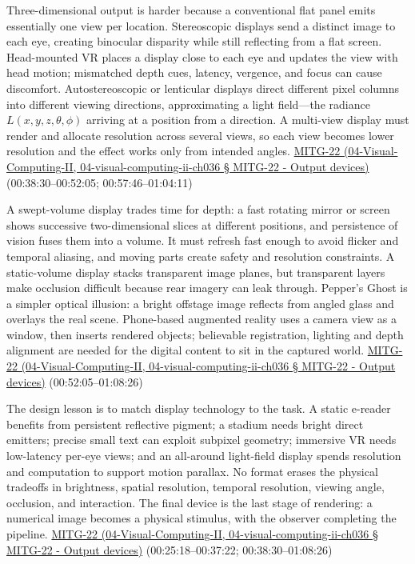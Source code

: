 Three-dimensional output is harder because a conventional flat panel emits essentially one view per location. Stereoscopic displays send a distinct image to each eye, creating binocular disparity while still reflecting from a flat screen. Head-mounted VR places a display close to each eye and updates the view with head motion; mismatched depth cues, latency, vergence, and focus can cause discomfort. Autostereoscopic or lenticular displays direct different pixel columns into different viewing directions, approximating a light field---the radiance \(L(x,y,z,\theta,\phi)\) arriving at a position from a direction. A multi-view display must render and allocate resolution across several views, so each view becomes lower resolution and the effect works only from intended angles. \href{}{MITG-22 (04-Visual-Computing-II, 04-visual-computing-ii-ch036 § MITG-22 - Output devices)} (00:38:30--00:52:05; 00:57:46--01:04:11)

A swept-volume display trades time for depth: a fast rotating mirror or screen shows successive two-dimensional slices at different positions, and persistence of vision fuses them into a volume. It must refresh fast enough to avoid flicker and temporal aliasing, and moving parts create safety and resolution constraints. A static-volume display stacks transparent image planes, but transparent layers make occlusion difficult because rear imagery can leak through. Pepper's Ghost is a simpler optical illusion: a bright offstage image reflects from angled glass and overlays the real scene. Phone-based augmented reality uses a camera view as a window, then inserts rendered objects; believable registration, lighting and depth alignment are needed for the digital content to sit in the captured world. \href{}{MITG-22 (04-Visual-Computing-II, 04-visual-computing-ii-ch036 § MITG-22 - Output devices)} (00:52:05--01:08:26)

The design lesson is to match display technology to the task. A static e-reader benefits from persistent reflective pigment; a stadium needs bright direct emitters; precise small text can exploit subpixel geometry; immersive VR needs low-latency per-eye views; and an all-around light-field display spends resolution and computation to support motion parallax. No format erases the physical tradeoffs in brightness, spatial resolution, temporal resolution, viewing angle, occlusion, and interaction. The final device is the last stage of rendering: a numerical image becomes a physical stimulus, with the observer completing the pipeline. \href{}{MITG-22 (04-Visual-Computing-II, 04-visual-computing-ii-ch036 § MITG-22 - Output devices)} (00:25:18--00:37:22; 00:38:30--01:08:26)

